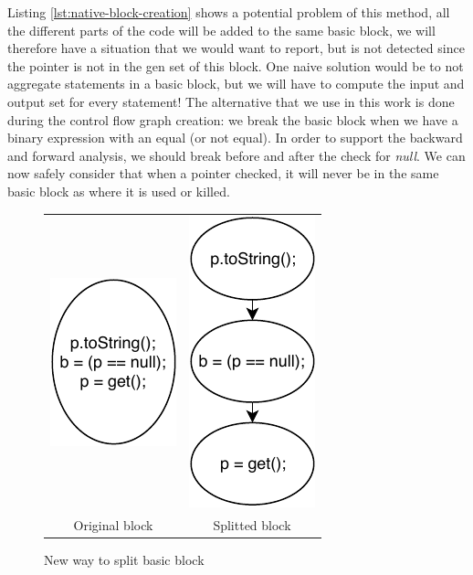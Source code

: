 Listing \ref{lst:native-block-creation} shows a potential problem of this method, all the different parts of the code will be added to the same basic block, we will therefore have a situation that we would want to report, but is not detected since the pointer is not in the gen set of this block. 
One naive solution would be to not aggregate statements in a basic block, but we will have to compute the input and output set for every statement! 
\newline
The alternative that we use in this work is done during the control flow graph creation: we break the basic block when we have a binary expression with an equal (or not equal). 
In order to support the backward and forward analysis, we should break before and after the check for \emph{null}. 
We can now safely consider that when a pointer checked, it will never be in the same basic block as where it is used or killed.
\begin{figure}[h]
\caption{New way to split basic block}
\label{figure:new-way-to-split}
\setlength{\tabcolsep}{24pt}
	\begin{tabular}{cc}
		\includegraphics[]{figure/original-block-cfg.pdf}  &
		\includegraphics[]{figure/splitted-block-cfg.pdf}   \\ 
		Original block & Splitted block
	\end{tabular}
\end{figure}

